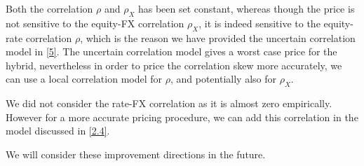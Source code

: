 \documentclass[11pt]{article}
\numberwithin{equation}{section}
\theoremstyle{remark}
\begin{document}
Both the correlation $\rho$ and $\rho_X$ has been set constant, whereas though the price is not sensitive to the equity-FX correlation $\rho_X$, it is indeed sensitive to the equity-rate correlation $\rho$, which is the reason we have provided the uncertain correlation model in \ref{5}. The uncertain correlation model gives a worst case price for the hybrid, nevertheless in order to price the correlation skew more accurately, we can use a local correlation model for $\rho$, and potentially also for $\rho_X$.

We did not consider the rate-FX correlation as it is almost zero empirically. However for a more accurate pricing procedure, we can add this correlation in the model discussed in \ref{2.4}.

We will consider these improvement directions in the future.
\end{document}
